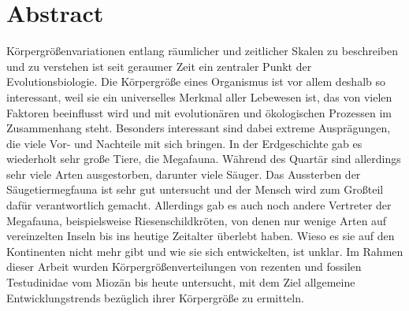 \section{Abstract}

Körpergrößenvariationen entlang räumlicher und zeitlicher Skalen zu beschreiben und zu verstehen ist seit geraumer Zeit ein zentraler Punkt der Evolutionsbiologie.
Die Körpergröße eines Organismus ist vor allem deshalb so interessant, weil sie ein universelles Merkmal aller Lebewesen ist, das von vielen Faktoren beeinflusst wird und mit evolutionären und ökologischen Prozessen im Zusammenhang steht. 
Besonders interessant sind dabei extreme Ausprägungen, die 
viele Vor- und Nachteile mit sich bringen.
In der Erdgeschichte gab es wiederholt sehr große Tiere, die Megafauna.
Während des Quartär sind allerdings sehr viele Arten ausgestorben, darunter viele Säuger. Das Aussterben der Säugetiermegfauna ist sehr gut untersucht und der Mensch wird zum Großteil dafür verantwortlich gemacht. 
Allerdings gab es auch noch andere Vertreter der Megafauna, beispielsweise Riesenschildkröten, von denen nur wenige Arten auf vereinzelten Inseln bis ins heutige Zeitalter überlebt haben. Wieso es sie auf den Kontinenten nicht mehr gibt und wie sie sich entwickelten, ist unklar.
Im Rahmen dieser Arbeit wurden Körpergrößenverteilungen von rezenten und fossilen Testudinidae vom Miozän bis heute untersucht, mit dem Ziel allgemeine Entwicklungstrends bezüglich ihrer Körpergröße zu ermitteln.
